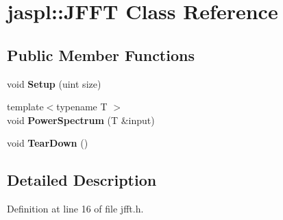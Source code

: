 \hypertarget{classjaspl_1_1_j_f_f_t}{}\section{jaspl\+:\+:J\+F\+FT Class Reference}
\label{classjaspl_1_1_j_f_f_t}
\subsection*{Public Member Functions}
\begin{DoxyCompactItemize}
\item 
void {\bfseries Setup} (uint size)\hypertarget{classjaspl_1_1_j_f_f_t_a9ae772905c4f41a2de1c8b62683f6b5e}{}\label{classjaspl_1_1_j_f_f_t_a9ae772905c4f41a2de1c8b62683f6b5e}

\item 
{\footnotesize template$<$typename T $>$ }\\void {\bfseries Power\+Spectrum} (T \&input)\hypertarget{classjaspl_1_1_j_f_f_t_a3953d73759cf17cb93f2b1e76691a8fe}{}\label{classjaspl_1_1_j_f_f_t_a3953d73759cf17cb93f2b1e76691a8fe}

\item 
void {\bfseries Tear\+Down} ()\hypertarget{classjaspl_1_1_j_f_f_t_a7ba090708a0e3b6e1dba81574fa52548}{}\label{classjaspl_1_1_j_f_f_t_a7ba090708a0e3b6e1dba81574fa52548}

\end{DoxyCompactItemize}


\subsection{Detailed Description}


Definition at line 16 of file jfft.\+h.

